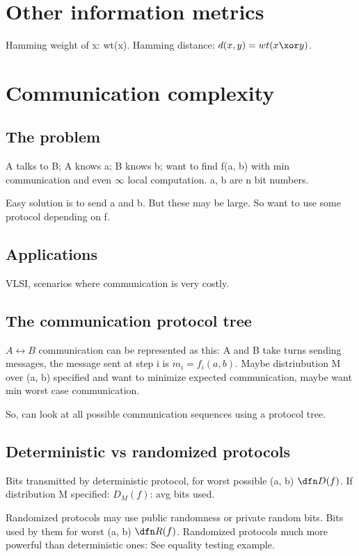 \documentclass[oneside, article]{memoir}
\begin{document}
\section{Other information metrics}
Hamming weight of x: wt(x). Hamming distance: $d(x,y) = wt(x \xor y)$.



\section{Communication complexity}
\subsection{The problem}
A talks to B; A knows a; B knows b; want to find f(a, b) with min communication and even $\infty$ local computation. a, b are n bit numbers.

Easy solution is to send a and b. But these may be large. So want to use some protocol depending on f.

\subsection{Applications}
VLSI, scenarios where communication is very costly.

\subsection{The communication protocol tree}
$A \leftrightarrow B$ communication can be represented as this: A and B take turns sending messages, the message sent at step i is $m_{i} = f_{i}(a, b)$. Maybe distriubution M over (a, b) specified and want to minimize expected communication, maybe want min worst case communication.

So, can look at all possible communication sequences using a protocol tree.

\subsection{Deterministic vs randomized protocols}
Bits transmitted by deterministic protocol, for worst possible (a, b) $\dfn D(f)$. If distribution M specified: $D_{M}(f)$: avg bits used.

Randomized protocols may use public randomness or private random bits. Bits used by them for worst (a, b) $\dfn R(f)$. Randomized protocols much more powerful than deterministic ones: See equality testing example.
\end{document}
